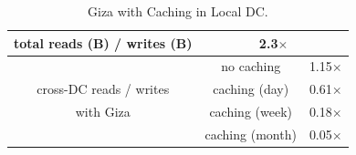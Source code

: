 \begin{table}[tp]
\centering
\begin{tabular}{|c||c|c|}
\hline \hline
total reads (B) / writes (B) 	& \multicolumn{2}{c|}{2.3$\times$}
\\ \hline \hline
	& no caching		& 1.15$\times$
\\ \cline{2-3}
cross-DC reads / writes
	& caching (day)		& 0.61$\times$ 
\\ \cline{2-3}
with Giza
	& caching (week)	& 0.18$\times$ 
\\ \cline{2-3}
	& caching (month)	& 0.05$\times$ 
\\ \hline \hline
\end{tabular}
\caption{Giza with Caching in Local DC.}
\label{tab:caching}
\end{table}

%
%


